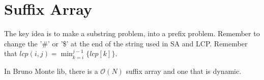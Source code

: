 \section{Suffix Array}
The key idea is to make a substring problem, into a prefix problem. Remember to change the '\#' or '\$' at the end of the string used in SA and LCP. Remember that $\displaystyle lcp(i,j) = \min_{k=i}^{j-1} \{lcp[k]\}$.

In Bruno Monte lib, there is a $\mathcal{O}(N)$ suffix array and one that is dynamic.


